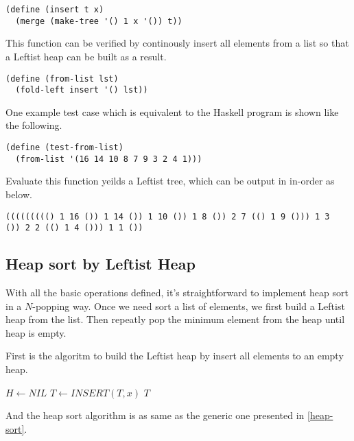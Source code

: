 \documentclass{article}
\begin{document}
\lstset{language=lisp}
\begin{lstlisting}
(define (insert t x)
  (merge (make-tree '() 1 x '()) t))
\end{lstlisting}

This function can be verified by continously insert all elements
from a list so that a Leftist heap can be built as a result.

\begin{lstlisting}
(define (from-list lst)
  (fold-left insert '() lst))
\end{lstlisting}

One example test case which is equivalent to the Haskell program
is shown like the following.

\begin{lstlisting}
(define (test-from-list)
  (from-list '(16 14 10 8 7 9 3 2 4 1)))
\end{lstlisting}

Evaluate this function yeilds a Leftist tree, which can be output
in in-order as below.

\begin{lstlisting}
((((((((() 1 16 ()) 1 14 ()) 1 10 ()) 1 8 ()) 2 7 (() 1 9 ())) 1 3 
()) 2 2 (() 1 4 ())) 1 1 ())
\end{lstlisting}

\subsection{Heap sort by Leftist Heap}

With all the basic operations defined, it's straightforward to 
implement heap sort in a $N$-popping way. Once we need sort a
list of elements, we first build a Leftist heap from the list.
Then repeatly pop the minimum element from the heap until heap
is empty.

First is the algoritm to build the Leftist heap by insert all
elements to an empty heap.

\begin{algorithmic}[1]
  \State $H \gets NIL$
    \State $T \gets INSERT(T, x)$
  \EndFor
  \State \Return $T$
\EndFunction
\end{algorithmic}

And the heap sort algorithm is as same as the generic one presented
in \ref{heap-sort}.
\end{document}
